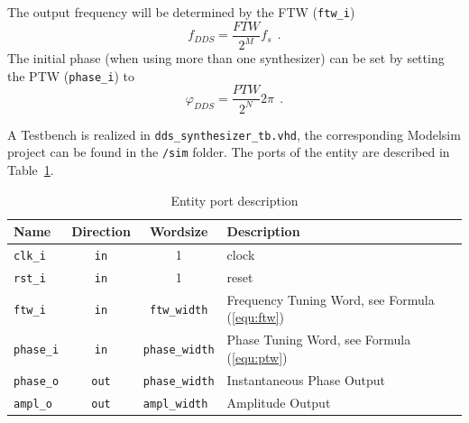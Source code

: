 \documentclass[a4paper,BCOR7mm,12pt,pointlessnumbers,bibtotoc]{scrartcl}
\begin{document}
The output frequency will be determined by the FTW (\verb|ftw_i|)
\begin{equation}
  f_{DDS}=\frac{FTW}{2^M} f_s \ \ .
  \label{equ:ftw}
\end{equation}
The initial phase (when using more than one synthesizer) can be set by setting the PTW (\verb|phase_i|) to
\begin{equation}
  \varphi_{DDS}=\frac{PTW}{2^N} 2 \pi \ \ .
  \label{equ:ptw}
\end{equation}

A Testbench is realized in \verb|dds_synthesizer_tb.vhd|, the corresponding Modelsim project can be found in the \verb|/sim| folder. The ports of the entity are described in Table~\ref{tab:ports}.

\begin{table}[H]
  \centering
    \begin{tabular}{l|c|c|l}
      \hline
      \hline
        Name & Direction & Wordsize & Description \\
        \hline
        \verb|clk_i|   & \verb|in|  & 1                  & clock \\
        \verb|rst_i|   & \verb|in|  & 1                  & reset  \\
        \verb|ftw_i|   & \verb|in|  & \verb|ftw_width|   & Frequency Tuning Word, see Formula (\ref{equ:ftw})  \\
        \verb|phase_i| & \verb|in|  & \verb|phase_width| & Phase Tuning Word, see Formula (\ref{equ:ptw})  \\
        \verb|phase_o| & \verb|out| & \verb|phase_width| & Instantaneous Phase Output  \\
        \verb|ampl_o|  & \verb|out| & \verb|ampl_width | & Amplitude Output  \\
      \hline
      \hline
    \end{tabular}
  \caption{Entity port description}
  \label{tab:ports}
\end{table}

%
%
\end{document}
